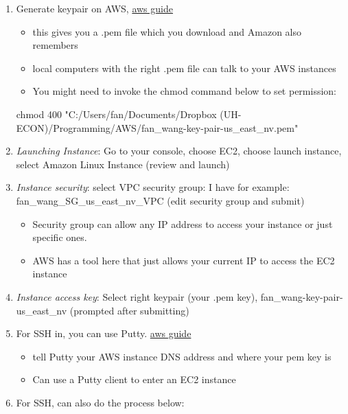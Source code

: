 \documentclass[
]{book}
\newenvironment{Shaded}{\begin{snugshade}}{\end{snugshade}}
\newcommand{\FunctionTok}[1]{\textcolor[rgb]{0.00,0.00,0.00}{#1}}
\newcommand{\NormalTok}[1]{#1}
\newcommand{\StringTok}[1]{\textcolor[rgb]{0.31,0.60,0.02}{#1}}
\providecommand{\tightlist}{%
  \setlength{\itemsep}{0pt}\setlength{\parskip}{0pt}}
\begin{document}
\begin{enumerate}
\def\labelenumi{\arabic{enumi}.}
\tightlist
\item
  Generate keypair on AWS, \href{https://docs.aws.amazon.com/AWSEC2/latest/UserGuide/ec2-key-pairs.html\#having-ec2-create-your-key-pair}{aws guide}

  \begin{itemize}
  \tightlist
  \item
    this gives you a .pem file which you download and Amazon also remembers
  \item
    local computers with the right .pem file can talk to your AWS instances
  \item
    You might need to invoke the chmod command below to set permission:
  \end{itemize}

\begin{Shaded}
\begin{Highlighting}[]
\FunctionTok{chmod}\NormalTok{ 400 }\StringTok{"C:/Users/fan/Documents/Dropbox (UH-ECON)/Programming/AWS/fan_wang-key-pair-us_east_nv.pem"}
\end{Highlighting}
\end{Shaded}
\item
  \emph{Launching Instance}: Go to your console, choose EC2, choose launch instance, select Amazon Linux Instance (review and launch)
\item
  \emph{Instance security}: select VPC security group: I have for example: fan\_wang\_SG\_us\_east\_nv\_VPC (edit security group and submit)

  \begin{itemize}
  \tightlist
  \item
    Security group can allow any IP address to access your instance or just specific ones.
  \item
    AWS has a tool here that just allows your current IP to access the EC2 instance
  \end{itemize}
\item
  \emph{Instance access key}: Select right keypair (your .pem key), fan\_wang-key-pair-us\_east\_nv (prompted after submitting)
\item
  For SSH in, you can use Putty. \href{https://docs.aws.amazon.com/AWSEC2/latest/UserGuide/putty.html}{aws guide}

  \begin{itemize}
  \tightlist
  \item
    tell Putty your AWS instance DNS address and where your pem key is
  \item
    Can use a Putty client to enter an EC2 instance
  \end{itemize}
\item
  For SSH, can also do the process below:


\end{enumerate}
\end{document}
